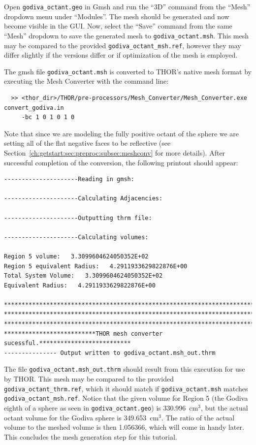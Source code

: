 Open \verb"godiva_octant.geo" in Gmsh and run the ``3D'' command from the ``Mesh'' dropdown menu under ``Modules''.
The mesh should be generated and now become visible in the GUI.
Now, select the ``Save'' command from the same ``Mesh'' dropdown to save the generated mesh to \verb"godiva_octant.msh".
This mesh may be compared to the provided \verb"godiva_octant_msh.ref", however they may differ slightly if the versions differ or if optimization of the mesh is employed.

The gmsh file \verb"godiva_octant.msh" is converted to THOR's native mesh format by executing the Mesh Converter with the command line:
\begin{verbatim}
  >> <thor_dir>/THOR/pre-processors/Mesh_Converter/Mesh_Converter.exe convert_godiva.in
     -bc 1 0 1 0 1 0
\end{verbatim}
Note that since we are modeling the fully positive octant of the sphere we are setting all of the flat negative faces to be reflective (see Section~\ref{ch:getstart:sec:preproc:subsec:meshconv} for more details).
After successful completion of the conversion, the following printout should appear:
\begin{verbatim}
---------------------Reading in gmsh:

---------------------Calculating Adjacencies:

---------------------Outputting thrm file:

---------------------Calculating volumes:

Region 5 volume:   3.3099604624050352E+02
Region 5 equivalent Radius:   4.2911933629822876E+00
Total System Volume:   3.3099604624050352E+02
Equivalent Radius:   4.2911933629822876E+00

**********************************************************************************
**********************************************************************************
**********************************************************************************
**************************THOR mesh converter sucessful.**************************
--------------- Output written to godiva_octant.msh_out.thrm
\end{verbatim}

The file \verb"godiva_octant.msh_out.thrm" should result from this execution for use by THOR.
This mesh may be compared to the provided \verb"godiva_octant_thrm.ref", which it should match if \verb"godiva_octant.msh" matches \verb"godiva_octant_msh.ref".
Notice that the given volume for Region 5 (the Godiva eighth of a sphere as seen in \verb"godiva_octant.geo") is 330.996~cm$^3$, but the actual octant volume for the Godiva sphere is 349.653~cm$^3$.
The ratio of the actual volume to the meshed volume is then 1.056366, which will come in handy later.
This concludes the mesh generation step for this tutorial.

